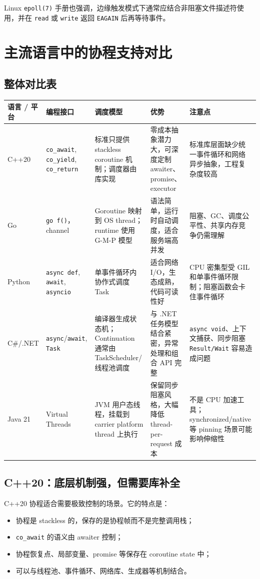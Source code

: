 \documentclass[UTF8,zihao=-4]{ctexart}
\begin{document}
Linux \texttt{epoll(7)} 手册也强调，边缘触发模式下通常应结合非阻塞文件描述符使用，并在 \texttt{read} 或 \texttt{write} 返回 \texttt{EAGAIN} 后再等待事件\cite{epoll}。

\section{主流语言中的协程支持对比}

\subsection{整体对比表}

{\small
\setlength{\tabcolsep}{3pt}
\begin{longtable}{@{}p{2.1cm}p{2.55cm}p{3.0cm}p{3.55cm}p{3.15cm}@{}}
\toprule
语言 / 平台 & 编程接口 & 调度模型 & 优势 & 注意点 \\
\midrule
C++20 & \texttt{co\_await}, \texttt{co\_yield}, \texttt{co\_return} & 标准只提供 stackless coroutine 机制；调度器由库实现 & 零成本抽象潜力大，可深度定制 awaiter、promise、executor & 标准库层面缺少统一事件循环和网络异步抽象，工程复杂度较高 \\
\midrule
Go & \texttt{go f()}，channel & Goroutine 映射到 OS thread；runtime 使用 G-M-P 模型 & 语法简单，运行时自动调度，适合服务端高并发 & 阻塞、GC、调度公平性、共享内存竞争仍需理解 \\
\midrule
Python & \texttt{async def}, \texttt{await}, \texttt{asyncio} & 单事件循环内协作式调度 Task & 适合网络 I/O，生态成熟，代码可读性好 & CPU 密集型受 GIL 和单事件循环限制；阻塞函数会卡住事件循环 \\
\midrule
C\#/.NET & \texttt{async}/\texttt{await}, \texttt{Task} & 编译器生成状态机；Continuation 通常由 TaskScheduler/线程池调度 & 与 .NET 任务模型结合紧密，异常处理和组合 API 完整 & \texttt{async void}、上下文捕获、同步阻塞 \texttt{Result/Wait} 容易造成问题 \\
\midrule
Java 21 & Virtual Threads & JVM 用户态线程，挂载到 carrier platform thread 上执行 & 保留同步阻塞风格，大幅降低 thread-per-request 成本 & 不是 CPU 加速工具；synchronized/native 等 pinning 场景可能影响伸缩性 \\
\bottomrule
\end{longtable}
}

\subsection{C++20：底层机制强，但需要库补全}

C++20 协程适合需要极致控制的场景。它的特点是：
\begin{itemize}
  \item 协程是 stackless 的，保存的是协程帧而不是完整调用栈；
  \item \texttt{co\_await} 的语义由 awaiter 控制；
  \item 协程恢复点、局部变量、promise 等保存在 coroutine state 中；
  \item 可以与线程池、事件循环、网络库、生成器等机制结合。
\end{itemize}
\end{document}
